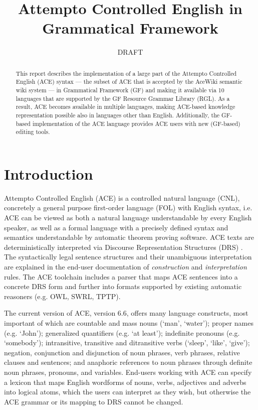 \documentclass[a4paper]{article}
\newcommand\ace{Attempto Controlled English}
\begin{document}
\title{Attempto Controlled English in Grammatical Framework}
\author{DRAFT}


\maketitle
\begin{abstract}
This report describes the implementation of a large part of the
Attempto Controlled English (ACE) syntax ---
the subset of ACE that is accepted by the AceWiki semantic wiki system ---
in Grammatical Framework (GF) and making it available via 10
languages that are supported by the GF Resource Grammar Library (RGL).
As a result, ACE becomes available in multiple languages, making
ACE-based knowledge representation possible also in languages other than
English.
Additionally, the GF-based implementation of the ACE language provides
ACE users with new (GF-based) editing tools.
\end{abstract}

\section{Introduction}

\ace{} (ACE) \cite{fuchs:reasoningweb2008} is a controlled natural language
(CNL), concretely a general purpose
first-order language (FOL)
with English syntax,
i.e. ACE can be viewed as both a natural language understandable by every
English speaker, as well as a formal language with a precisely defined
syntax and semantics understandable by automatic theorem proving software.
ACE texts are deterministically interpreted
via Discourse Representation Structures (DRS) \cite{kamp:drt1993}.
The syntactically legal sentence structures and their
unambiguous interpretation are explained in the end-user documentation of
\emph{construction} and \emph{interpretation} rules.
The ACE toolchain includes a parser that maps ACE sentences into a concrete
DRS form \cite{ifi-2010.0010} and further into formats supported by existing
automatic reasoners (e.g. OWL, SWRL, TPTP).

The current version of ACE, version 6.6, offers many language constructs, most
important of which are
countable and mass nouns (`man', `water');
proper names (e.g. `John');
generalized quantifiers (e.g. `at least');
indefinite pronouns (e.g. `somebody');
intransitive, transitive and ditransitive verbs (`sleep', `like', `give');
negation, conjunction and disjunction of
noun phrases, verb phrases, relative clauses and sentences;
and anaphoric references to noun phrases through
definite noun phrases, pronouns, and variables.
End-users working with ACE can specify a lexicon that maps English
wordforms of nouns, verbs, adjectives and adverbs into logical atoms,
which the users
can interpret as they wish, but otherwise the ACE grammar or its mapping to
DRS cannot be changed.
\end{document}

